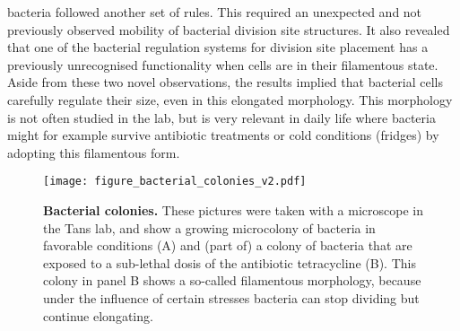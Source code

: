 bacteria followed another set of rules.
%
This required an unexpected and not previously observed mobility 
of bacterial division site structures.
It also revealed that 
one of the bacterial regulation systems for division site placement
has a previously unrecognised functionality when cells are in their filamentous state.
%
Aside from these two novel observations, 
the results implied that bacterial cells carefully regulate their size,
even in this elongated morphology.
%
This morphology is not often studied in the lab, 
but is very relevant in daily life where bacteria might for example survive antibiotic treatments or cold conditions (fridges) by adopting this filamentous form.
%

\begin{figure}
    \begin{minipage}[c]{0.5\textwidth}
        \texttt{[image: figure\_bacterial\_colonies\_v2.pdf]}
    \end{minipage}\hfill
    \begin{minipage}[c]{0.5\textwidth}
        \caption{ 
            \textbf{Bacterial colonies.}
            These pictures were taken with a microscope in the Tans lab, and show a growing microcolony of bacteria in favorable conditions (A) and (part of) a colony of bacteria that are exposed to a sub-lethal dosis of the antibiotic tetracycline (B). This colony in panel B shows a so-called filamentous morphology, because under the influence of certain stresses bacteria can stop dividing but continue elongating. 
        }
        \label{fig:intro:bacs}
    \end{minipage}
\end{figure}


